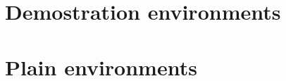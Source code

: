 \documentclass[toc,todo]{apuntes}
\begin{document}
\begin{prop}[][reff]
	\lipsum[1]
\end{prop}

\begin{teorema}[][reff]
	\lipsum[1]
\end{teorema}

\begin{corolario}[][reff]
	\lipsum[1]
\end{corolario}

\begin{lema}[][reff]
	\lipsum[1]
\end{lema}

\section{Demostration environments}

\begin{dem}[]
	\lipsum[1]
\end{dem}

\begin{sol}[]
	\lipsum[1]
\end{sol}

\section{Plain environments}

\begin{aff}[]
	\lipsum[1]
\end{aff}

\begin{ejemplo}[][reff]
	\lipsum[1]
\end{ejemplo}

\begin{ejercicio}[][reff]
	\lipsum[1]
\end{ejercicio}

\begin{pregunta}[][reff]
	\lipsum[1]
\end{pregunta}

\begin{obs}[][reff]
	\lipsum[1]
\end{obs}

\begin{notacion}[]
	\lipsum[1]
\end{notacion}

\begin{recuerdo}[]
	\lipsum[1]
\end{recuerdo}

\begin{nota}[]
	\lipsum[1]
\end{nota}
\end{document}
